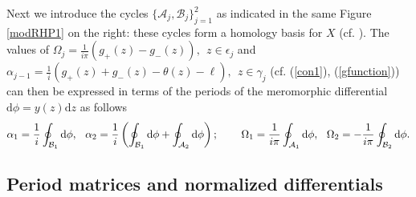 \documentclass[10pt,oneside,reqno]{amsart}
\numberwithin{equation}{section}
\renewcommand{\d}{{\mathrm d}}
\def\eqref#1{(\ref{#1})}
\begin{document}
%
%
%
Next we introduce the cycles $\{\mathcal{A}_j,\mathcal{B}_j\}_{j=1}^2$ as indicated in the same Figure \ref{modRHP1} on the right: these cycles form a homology 
basis for $X$ (cf. \cite{FK}). The values of $\Omega_j = \frac{1}{i\pi}(g_+(z) - g_-(z)),\ \ z\in \epsilon_j$ and $\alpha_{j-1} = \frac{1}{i}(g_+(z) + g_-(z) - \theta(z)- \ell) ,\ \ z\in \mathcal \gamma_j$ (cf. \eqref{con1}, \eqref{gfunction}) can then be expressed in terms of the periods of the meromorphic differential $\d\phi=y(z)\d z$ as follows
\begin{equation}\label{gj}
  \alpha_1 = \frac{1}{i}\oint_{\mathcal{B}_1}\d\phi,\hspace{0.25cm}\alpha_2=\frac{1}{i}\left(\oint_{\mathcal{B}_1}\d\phi+\oint_{\mathcal{A}_2}\d\phi\right);\hspace{0.75cm}
  \Omega_1 = \frac{1}{i\pi}\oint_{\mathcal{A}_1}\d\phi,\hspace{0.25cm}\Omega_2=-\frac{1}{i\pi}\oint_{\mathcal{B}_2}\d\phi.
\end{equation}


\subsection{Period matrices and normalized differentials}
\label{permat}
\end{document}
